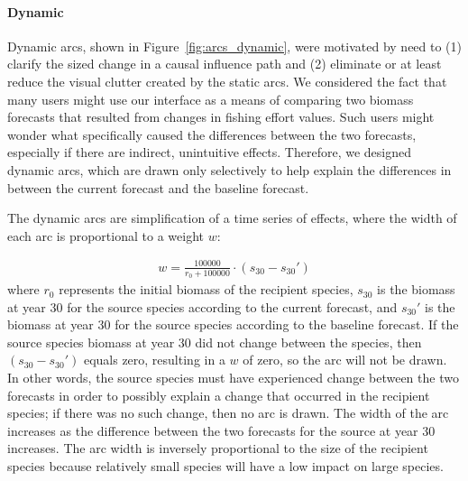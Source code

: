 \paragraph{Dynamic}

Dynamic arcs, shown in Figure~\ref{fig:arcs_dynamic}, were motivated by need to (1) clarify the sized change in a causal influence path and (2) eliminate or at least reduce the visual clutter created by the static arcs.  We considered the fact that many users might use our interface as a means of comparing two biomass forecasts that resulted from changes in fishing effort values.  Such users might wonder what specifically caused the differences between the two forecasts, especially if there are indirect, unintuitive effects.  Therefore, we designed dynamic arcs, which are drawn only selectively to help explain the differences in between the current forecast and the baseline forecast.

The dynamic arcs are simplification of a time series of effects, where the width of each arc is proportional to a weight $w$:

\begin{align}
w = \frac{100000}{r_{0} + 100000} \cdot (s_{30} - s_{30}')
\end{align}
where $r_{0}$ represents the initial biomass of the recipient species, $s_{30}$ is the biomass at year 30 for the source species according to the current forecast, and $s_{30}'$ is the biomass at year 30 for the source species according to the baseline forecast.  If the source species biomass at year 30 did not change between the species, then $(s_{30} - s_{30}')$ equals zero, resulting in a $w$ of zero, so the arc will not be drawn.  In other words, the source species must have experienced change between the two forecasts in order to possibly explain a change that occurred in the recipient species; if there was no such change, then no arc is drawn.  The width of the arc increases as the difference between the two forecasts for the source at year 30 increases.  The arc width is inversely proportional to the size of the recipient species because relatively small species will have a low impact on large species.%

